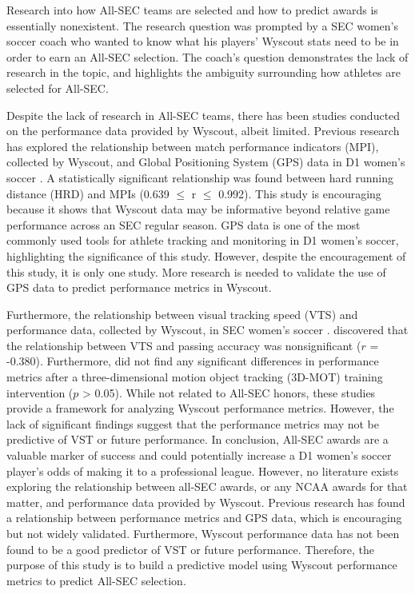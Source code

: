 \documentclass{article}
\begin{document}
Research into how All-SEC teams are selected and how to predict awards is essentially nonexistent. The research question was prompted by a SEC women’s soccer coach who wanted to know what his players’ Wyscout stats need to be in order to earn an All-SEC selection. The coach’s question demonstrates the lack of research in the topic, and highlights the ambiguity surrounding how athletes are selected for All-SEC.

Despite the lack of research in All-SEC teams, there has been studies conducted on the performance data provided by Wyscout, albeit limited. Previous research has explored the relationship between match performance indicators (MPI), collected by Wyscout, and Global Positioning System (GPS) data in D1 women’s soccer \cite{sam2023}. A statistically significant relationship was found between hard running distance (HRD) and MPIs (0.639 $\leq$ r $\leq$ 0.992). This study is encouraging because it shows that Wyscout data may be informative beyond relative game performance across an SEC regular season. GPS data is one of the most commonly used tools for athlete tracking and monitoring in D1 women’s soccer, highlighting the significance of this study. However, despite the encouragement of this study, it is only one study. More research is needed to validate the use of GPS data to predict performance metrics in Wyscout. 

Furthermore, the relationship between visual tracking speed (VTS) and performance data, collected by Wyscout, in SEC women’s soccer \cite{phillips2022,phillips2023}.  discovered that the relationship between VTS and passing accuracy was nonsignificant ($r$  = -0.380). Furthermore,  did not find any significant differences in performance metrics after a three-dimensional motion object tracking (3D-MOT) training intervention ($p$ > 0.05). While not related to All-SEC honors, these studies provide a framework for analyzing Wyscout performance metrics. However, the lack of significant findings suggest that the performance metrics may not be predictive of VST or future performance. 
In conclusion, All-SEC awards are a valuable marker of success and could potentially increase a D1 women’s soccer player’s odds of making it to a professional league. However, no literature exists exploring the relationship between all-SEC awards, or any NCAA awards for that matter, and performance data provided by Wyscout. Previous research has found a relationship between performance metrics and GPS data, which is encouraging but not widely validated. Furthermore, Wyscout performance data has not been found to be a good predictor of VST or future performance. Therefore, the purpose of this study is to build a predictive model using Wyscout performance metrics to predict All-SEC selection.
\end{document}
